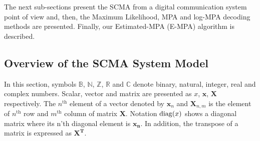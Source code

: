 
The next sub-sections present the SCMA from a digital communication system
point of view and, then, the Maximum Likelihood, MPA and log-MPA decoding
methods are presented. Finally, our Estimated-MPA (E-MPA) algorithm is
described.

\subsection{Overview of the SCMA System Model}
\label{sec:scma_overview}

In this section, symbols $\mathbb{B}$, $\mathbb{N}$, $\mathbb{Z}$, $\mathbb{R}$
and $\mathbb{C}$ denote binary, natural, integer, real and complex numbers.
Scalar, vector and matrix are presented as $x$, $\bm{x}$, $\bm{X}$ respectively.
The $n^\text{th}$ element of a vector denoted by $\bm{x}_n$ and $\bm{X}_{n,m}$
is the element of $n^\text{th}$ row and $m^\text{th}$ column of matrix $\bm{X}$.
Notation $\operatorname{diag}(x)$ shows a diagonal matrix where its n'th diagonal element is
$\bm{x_n}$. In addition, the transpose of a matrix is expressed as $\bm{X^T}$.

